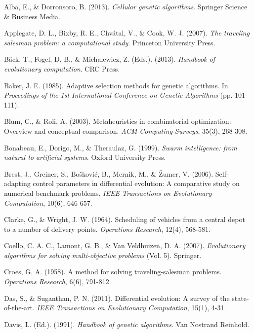 \documentclass[12pt,a4paper]{article}
\begin{document}
\begin{thebibliography}{99}

Alba, E., \& Dorronsoro, B. (2013). \textit{Cellular genetic algorithms}. Springer Science \& Business Media.

Applegate, D. L., Bixby, R. E., Chvátal, V., \& Cook, W. J. (2007). \textit{The traveling salesman problem: a computational study}. Princeton University Press.

Bäck, T., Fogel, D. B., \& Michalewicz, Z. (Eds.). (2013). \textit{Handbook of evolutionary computation}. CRC Press.

Baker, J. E. (1985). Adaptive selection methods for genetic algorithms. In \textit{Proceedings of the 1st International Conference on Genetic Algorithms} (pp. 101-111).

Blum, C., \& Roli, A. (2003). Metaheuristics in combinatorial optimization: Overview and conceptual comparison. \textit{ACM Computing Surveys}, 35(3), 268-308.

Bonabeau, E., Dorigo, M., \& Theraulaz, G. (1999). \textit{Swarm intelligence: from natural to artificial systems}. Oxford University Press.

Brest, J., Greiner, S., Bošković, B., Mernik, M., \& Žumer, V. (2006). Self-adapting control parameters in differential evolution: A comparative study on numerical benchmark problems. \textit{IEEE Transactions on Evolutionary Computation}, 10(6), 646-657.

Clarke, G., \& Wright, J. W. (1964). Scheduling of vehicles from a central depot to a number of delivery points. \textit{Operations Research}, 12(4), 568-581.

Coello, C. A. C., Lamont, G. B., \& Van Veldhuizen, D. A. (2007). \textit{Evolutionary algorithms for solving multi-objective problems} (Vol. 5). Springer.

Croes, G. A. (1958). A method for solving traveling-salesman problems. \textit{Operations Research}, 6(6), 791-812.

Das, S., \& Suganthan, P. N. (2011). Differential evolution: A survey of the state-of-the-art. \textit{IEEE Transactions on Evolutionary Computation}, 15(1), 4-31.

Davis, L. (Ed.). (1991). \textit{Handbook of genetic algorithms}. Van Nostrand Reinhold.


\end{thebibliography}
\end{document}

